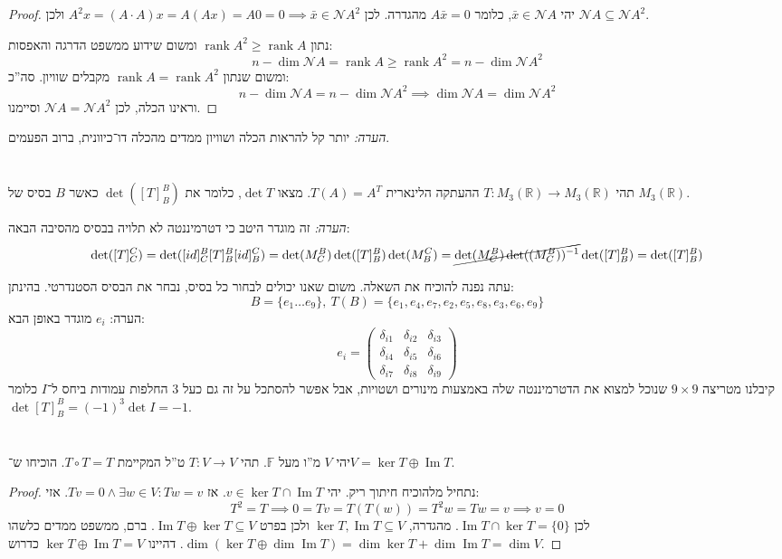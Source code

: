 \documentclass[]{article}
\newcommand\R     {\mathbb{R}}
\newcommand\nc    {\mathcal{N}}
\DeclareMathOperator\Img   {Im}
\DeclareMathOperator{\rk}     {rank}
\newcommand\F         {\mathbb{F}}
\newcommand\co        {\colon}
\newcommand\pms[1]    {\begin{pmatrix}
		#1
\end{pmatrix}}
\newcommand\dg        {\delta}
\newcommand\op    {^{-1}}
\theoremstyle{definition}
\begin{document}
	\begin{proof}
		יהי $\bar x \in \nc A$, כלומר $A\bar x = 0$ מהגדרה. לכן $A^2x = (A \cdot A)x = A(Ax) = A0 = 0 \implies \bar x \in \nc A^2$ ולכן $\nc A \subseteq \nc A^2$. 
		
		נתון $\rk A^2 \ge \rk A$ ומשום שידוע ממשפט הדרגה והאפסות:
		\[ n - \dim \nc A  = \rk A\ge \rk A^2 = n - \dim \nc A^2 \]
		ומשום שנתון $\rk A = \rk A^2$ מקבלים שוויון. סה''כ: 
		\[ n - \dim \nc A = n - \dim \nc A^2 \implies \dim \nc A = \dim \nc A^2 \]
		וראינו הכלה, לכן $\nc A = \nc A^2$ וסיימנו. 
	\end{proof}
	\textit{הערה: }יותר קל להראות הכלה ושוויון ממדים מהכלה דו־כיוונית, ברוב הפעמים. 
	
	\section{}
	תהי $T \co M_3(\R) \to M_3(\R)$ ההעתקה הלינארית $T(A) = A^T$. מצאו $\det T$, כלומר את $\det([T]^B_B)$ כאשר $B$ בסיס של $M_3(\R)$. 
	
	\textit{הערה: }זה מוגדר היטב כי דטרמיננטה לא תלויה בבסיס מהסיבה הבאה: 
	\[ \det([T]_C^C) = \det([id]_C^B[T]^B_B[id]_B^C) = \det(M_C^B)\det([T]^B_B)\det(M_B^C) = \cancel{\det(M_C^B)\det((M_C^B))\op }\det([T]_B^B) = \det ([T]^B_B) \]
	
	עתה נפנה להוכיח את השאלה. משום שאנו יכולים לבחור כל בסיס, נבחר את הבסיס הסטנדרטי. בהינתן: 
	\[ B = \{e_1 \dots e_9\}, \ T(B) = \{e_1, e_4, e_7, e_2, e_5, e_8, e_3, e_6, e_9\} \]
	הערה: $e_i$ מוגדר באופן הבא: 
	\[ e_i = \pms{\dg_{i1} & \dg_{i2} & \dg_{i3} \\ \dg_{i4} & \dg_{i5} & \dg_{i6} \\ \dg_{i7} & \dg_{i8} & \dg_{i9}} \]
	קיבלנו מטריצה $9 \times 9$ שנוכל למצוא את הדטרמיננטה שלה באמצעות מינורים ושטויות, אבל אפשר להסתכל על זה גם כעל $3$ החלפות עמודות ביחס ל־$I$ כלומר $\det[T]^B_B = (-1)^{3}\det I = -1$. 
	
	\section{}
	יהי $V$ מ''ו מעל $\F$. תהי $T \co V \to V$ ט''ל המקיימת $T \circ T = T$. הוכיחו ש־$V = \ker T \oplus \Img T$. 
	
	\begin{proof}
		נתחיל מלהוכיח חיתוך ריק. יהי $v \in \ker T \cap \Img T$. אז $Tv = 0 \land \exists w \in V \co Tw = v$. אזי: 
		\[ T^2 = T \implies 0 = Tv = T(T(w)) = T^2w = Tw = v \implies v = 0 \]
		לכן $\Img T \cap \ker T = \{0\}$. מהגדרה, $\ker T, \Img T \subseteq V$ ולכן בפרט $\Img T \oplus \ker T \subseteq V$. ברם, ממשפט ממדים כלשהו $\dim(\ker T \oplus \dim \Img T) = \dim \ker T + \dim \Img T = \dim V$. דהיינו $\ker T \oplus \Img T = V$ כדרוש. 
	
	\end{proof}
	
\end{document}
